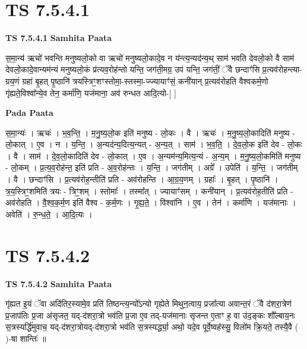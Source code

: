 \documentclass[17pt]{extarticle}
\begin{document}
\section{ TS 7.5.4.1 }

\textbf{TS 7.5.4.1 } \newline
\textbf{Samhita Paata} \newline

स॒मा॒न्य॑ ऋचो॑ भवन्ति मनुष्यलो॒को वा ऋचो॑ मनुष्यलो॒कादे॒व न य॑न्त्य॒न्यद॑न्य॒थ् साम॑ भवति देवलो॒को वै साम॑ देवलो॒कादे॒वान्यम॑न्यं मनुष्यलो॒कं प्र॑त्यव॒रोह॑न्तो यन्ति॒ जग॑ती॒मग्र॒ उप॑ यन्ति॒ जग॑तीं॒ ॅवै छन्दाꣳ॑सि प्र॒त्यव॑रोहन्त्या-ग्रय॒णं ग्रहा॑ बृ॒हत् पृ॒ष्ठानि॑ त्रयस्त्रिꣳ॒॒शꣳस्तोमा॒-स्तस्मा॒-ज्ज्यायाꣳ॑सं॒ कनी॑यान् प्र॒त्यव॑रोहति वैश्वकर्म॒णो गृ॑ह्यते॒विश्वा᳚न्ये॒व तेन॒ कर्मा॑णि॒ यज॑माना॒ अव॑ रुन्धत आदि॒त्यो-[  ] \newline

\textbf{Pada Paata} \newline

स॒मा॒न्यः॑ । ऋचः॑ । भ॒व॒न्ति॒ । म॒नु॒ष्य॒लो॒क इति॑ मनुष्य - लो॒कः । वै । ऋचः॑ । म॒नु॒ष्य॒लो॒कादिति॑ मनुष्य - लो॒कात् । ए॒व । न । य॒न्ति॒ । अ॒न्यद॑न्य॒दित्य॒न्यत् - अ॒न्य॒त् । साम॑ । भ॒व॒ति॒ । दे॒व॒लो॒क इति॑ देव - लो॒कः । वै । साम॑ । दे॒व॒लो॒कादिति॑ देव - लो॒कात् । ए॒व । अ॒न्यम॑न्य॒मित्य॒न्यं - अ॒न्य॒म् । म॒नु॒ष्य॒लो॒कमिति॑ मनुष्य - लो॒कम् । प्र॒त्य॒व॒रोह॑न्त॒ इति॑ प्रति - अ॒व॒रोह॑न्तः । य॒न्ति॒ । जग॑तीम् । अग्रे᳚ । उपेति॑ । य॒न्ति॒ । जग॑तीम् । वै । छन्दाꣳ॑सि । प्र॒त्यव॑रोह॒न्तीति॑ प्रति - अव॑रोहन्ति । आ॒ग्र॒य॒णम् । ग्रहाः᳚ । बृ॒हत् । पृ॒ष्ठानि॑ । त्र॒य॒स्त्रिꣳ॒॒शमिति॑ त्रयः - त्रिꣳ॒॒शम् । स्तोमाः᳚ । तस्मा᳚त् । ज्यायाꣳ॑सम् । कनी॑यान् । प्र॒त्यव॑रोह॒तीति॑ प्रति - अव॑रोहति । वै॒श्व॒क॒र्म॒ण इति॑ वैश्व - क॒र्म॒णः । गृ॒ह्य॒ते॒ । विश्वा॑नि । ए॒व । तेन॑ । कर्मा॑णि । यज॑मानाः । अवेति॑ । रु॒न्ध॒ते॒ । आ॒दि॒त्यः ।  \newline





\section{ TS 7.5.4.2 }

\textbf{TS 7.5.4.2 } \newline
\textbf{Samhita Paata} \newline

गृ॑ह्यत इ॒यं ॅवा अदि॑तिर॒स्यामे॒व प्रति॑ तिष्ठन्त्य॒न्यो᳚ऽन्यो गृह्येते मिथुन॒त्वाय॒ प्रजा᳚त्या अवान्त॒रं ॅवै द॑शरा॒त्रेण॑ प्र॒जाप॑तिः प्र॒जा अ॑सृजत॒ यद्-द॑शरा॒त्रो भव॑ति प्र॒जा ए॒व तद्-यज॑मानाः सृजन्त ए॒ताꣳ ह॒ वा उ॑द॒ङ्कः शौ᳚ल्बाय॒नः स॒त्रस्यर्द्धि॑मुवाच॒ यद्-द॑शरा॒त्रोयद्-द॑शरा॒त्रो भव॑ति स॒त्रस्यर्द्ध्या॒ अथो॒ यदे॒व पूर्वे॒ष्वह॑स्सु॒ विलो॑म क्रि॒यते॒ तस्यै॒वै ( )-षा शान्तिः॑ ॥ \newline
\end{document}
